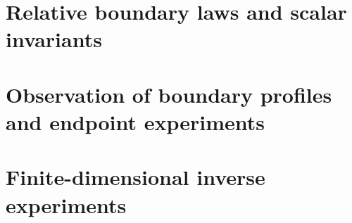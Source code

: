 \part{Relative boundary laws and scalar invariants}









\part{Observation of boundary profiles and endpoint experiments}




\part{Finite-dimensional inverse experiments}









